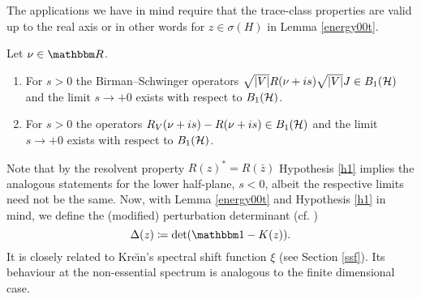 The applications we have in mind require that the trace-class properties are valid up to the real axis
or in other words for $z\in\sigma(H)$ in Lemma \ref{energy00t}.

\begin{hypothesis}\label{h1}
Let $\nu\in\R$.
\begin{enumerate}
\item 
For $s>0$ the Birman--Schwinger operators $\sqrt{|V|}R(\nu+is)\sqrt{|V|}J\in B_1({\mathcal H})$ and the limit
$s\to+0$ exists with respect to $B_1({\mathcal H})$.
\item 
For $s>0$ the operators $R_V(\nu+is)-R(\nu+is)\in B_1({\mathcal H})$ and the limit $s\to+0$ exists 
with respect to $B_1({\mathcal H})$.
\end{enumerate}
\end{hypothesis}

Note that by the resolvent property $R(z)^* = R(\bar z)$ Hypothesis \ref{h1} implies the analogous statements
for the lower half-plane, $s<0$, albeit the respective limits need not be the same. 
Now, with Lemma \ref{energy00t} and Hypothesis \ref{h1} in mind, we define
the (modified) perturbation determinant (cf. \cite[(0.9.35)]{Yafaev2010})
\begin{equation}\label{perturbation_determinant}
  \Delta(z) \coloneqq \det(\id - K(z)) .
\end{equation}
It is closely related to Kre\u\i{}n's spectral shift function $\xi$ (see Section \ref{ssf}).
Its behaviour at the non-essential spectrum is analogous to the finite dimensional case.

